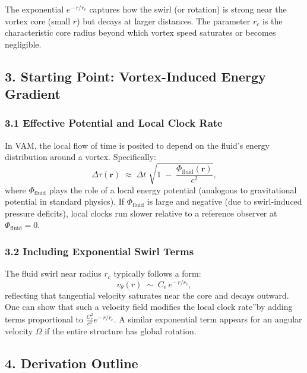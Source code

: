 The exponential \(e^{-\,r/r_c}\) captures how the swirl (or rotation) is strong near the vortex core (small \(r\)) but decays at larger distances. The parameter \(r_c\) is the characteristic core radius beyond which vortex speed saturates or becomes negligible.

\subsection*{3. Starting Point: Vortex-Induced Energy Gradient}

\subsubsection*{3.1 Effective Potential and Local Clock Rate}

In VAM, the local flow of time is posited to depend on the fluid's energy distribution around a vortex. Specifically:
\[
    \Delta \tau(\mathbf{r})
    \;\approx\;
    \Delta t
    \;\sqrt{
        1
        \;-\;
        \frac{\Phi_{\mathrm{fluid}}(\mathbf{r})}{c^2}
    },
\]
where \(\Phi_{\mathrm{fluid}}\) plays the role of a local energy potential (analogous to gravitational potential in standard physics). If \(\Phi_{\mathrm{fluid}}\) is large and negative (due to swirl-induced pressure deficits), local clocks run slower relative to a reference observer at \(\Phi_{\mathrm{fluid}}=0\).

\subsubsection*{3.2 Including Exponential Swirl Terms}

The fluid swirl near radius \(r_c\) typically follows a form:
\[
    v_{\theta}(r)
    \;\sim\;
    C_e \,e^{-\,r/r_c},
\]
reflecting that tangential velocity saturates near the core and decays outward. One can show that such a velocity field modifies the local \grqq clock rate\textquotedblright by adding terms proportional to \(\tfrac{C_e^2}{c^2} e^{-\,r/r_c}\). A similar exponential term appears for an angular velocity \(\Omega\) if the entire structure has global rotation.

\subsection*{4. Derivation Outline}

